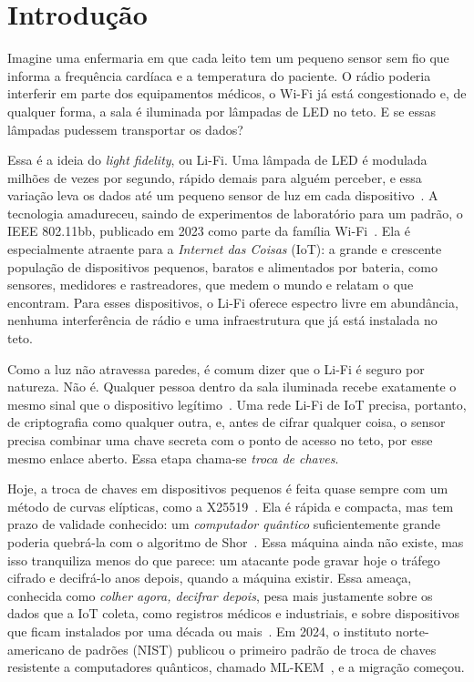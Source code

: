 \section{Introdução}\label{sec:intro}

Imagine uma enfermaria em que cada leito tem um pequeno sensor sem fio que
informa a frequência cardíaca e a temperatura do paciente. O rádio poderia
interferir em parte dos equipamentos médicos, o Wi-Fi já está congestionado e,
de qualquer forma, a sala é iluminada por lâmpadas de LED no teto. E se essas
lâmpadas pudessem transportar os dados?

Essa é a ideia do \emph{light fidelity}, ou Li-Fi. Uma lâmpada de LED é
modulada milhões de vezes por segundo, rápido demais para alguém perceber, e
essa variação leva os dados até um pequeno sensor de luz em cada
dispositivo~\cite{haas2016lifi}. A tecnologia amadureceu, saindo de
experimentos de laboratório para um padrão, o IEEE 802.11bb, publicado em 2023
como parte da família Wi-Fi~\cite{ieee80211bb}. Ela é especialmente atraente
para a \emph{Internet das Coisas} (IoT): a grande e crescente população de
dispositivos pequenos, baratos e alimentados por bateria, como sensores,
medidores e rastreadores, que medem o mundo e relatam o que encontram. Para
esses dispositivos, o Li-Fi oferece espectro livre em abundância, nenhuma
interferência de rádio e uma infraestrutura que já está instalada no teto.

Como a luz não atravessa paredes, é comum dizer que o Li-Fi é seguro por
natureza. Não é. Qualquer pessoa dentro da sala iluminada recebe exatamente o
mesmo sinal que o dispositivo legítimo~\cite{blinowski2019vlcsec,
arfaoui2020plsvlc}. Uma rede Li-Fi de IoT precisa, portanto, de criptografia
como qualquer outra, e, antes de cifrar qualquer coisa, o sensor precisa
combinar uma chave secreta com o ponto de acesso no teto, por esse mesmo enlace
aberto. Essa etapa chama-se \emph{troca de chaves}.

Hoje, a troca de chaves em dispositivos pequenos é feita quase sempre com um
método de curvas elípticas, como a
X25519~\cite{bernstein2006curve25519,rfc7748}. Ela é rápida e compacta, mas tem
prazo de validade conhecido: um \emph{computador quântico} suficientemente
grande poderia quebrá-la com o algoritmo de Shor~\cite{shor1997}. Essa máquina
ainda não existe, mas isso tranquiliza menos do que parece: um atacante pode
gravar hoje o tráfego cifrado e decifrá-lo anos depois, quando a máquina
existir. Essa ameaça, conhecida como \emph{colher agora, decifrar depois},
pesa mais justamente sobre os dados que a IoT coleta, como registros médicos e
industriais, e sobre dispositivos que ficam instalados por uma década ou
mais~\cite{mosca2018quantum}. Em 2024, o instituto norte-americano de padrões
(NIST) publicou o primeiro padrão de troca de chaves resistente a computadores
quânticos, chamado ML-KEM~\cite{fips203}, e a migração começou.

